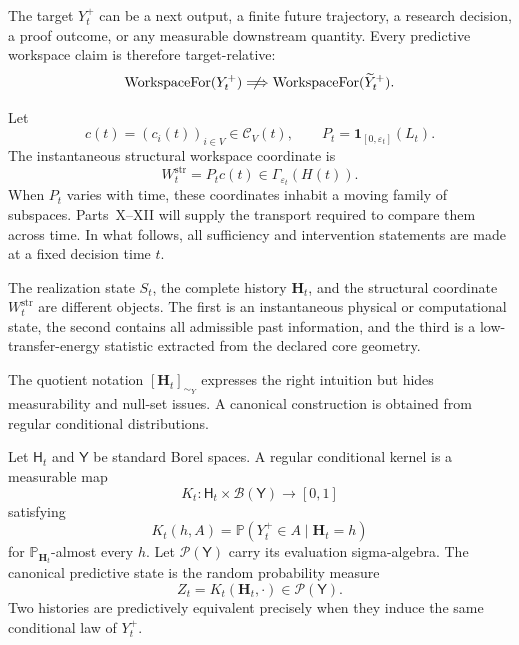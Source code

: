 The target \(Y_t^+\) can be a next output, a finite future trajectory, a
research decision, a proof outcome, or any measurable downstream quantity.
Every predictive workspace claim is therefore target-relative:
\[
\operatorname{WorkspaceFor}(Y_t^+)
\centernot\Longrightarrow
\operatorname{WorkspaceFor}(\widetilde Y_t^+).
\]

Let
\[
c(t)=(c_i(t))_{i\in V}
\in
\mathcal C_V(t),
\qquad
P_t=\mathbf 1_{[0,\varepsilon_t]}(L_t).
\]
The instantaneous structural workspace coordinate is
\[
\boxed{
W_t^{\mathrm{str}}=P_tc(t)
\in
\Gamma_{\varepsilon_t}(H(t)).
}
\]
When \(P_t\) varies with time, these coordinates inhabit a moving family of
subspaces. Parts~X--XII will supply the transport required to compare them
across time. In what follows, all sufficiency and intervention statements
are made at a fixed decision time \(t\).

\begin{remark}
The realization state \(S_t\), the complete history \(\mathbf H_t\), and the
structural coordinate \(W_t^{\mathrm{str}}\) are different objects. The first
is an instantaneous physical or computational state, the second contains all
admissible past information, and the third is a low-transfer-energy statistic
extracted from the declared core geometry.
\end{remark}


The quotient notation
\([\mathbf H_t]_{\sim_Y}\) expresses the right intuition but hides
measurability and null-set issues. A canonical construction is obtained from
regular conditional distributions.

\begin{definition}\label{def:predictive-kernel}
Let \(\mathsf H_t\) and \(\mathsf Y\) be standard Borel spaces. A regular
conditional kernel is a measurable map
\[
K_t:\mathsf H_t\times\mathcal B(\mathsf Y)\to[0,1]
\]
satisfying
\[
K_t(h,A)
=
\mathbb P(Y_t^+\in A\mid\mathbf H_t=h)
\]
for \(\mathbb P_{\mathbf H_t}\)-almost every \(h\). Let
\(\mathcal P(\mathsf Y)\) carry its evaluation sigma-algebra. The canonical
predictive state is the random probability measure
\[
\boxed{
Z_t
=
K_t(\mathbf H_t,\cdot)
\in
\mathcal P(\mathsf Y).
}
\]
Two histories are predictively equivalent precisely when they induce the same
conditional law of \(Y_t^+\).
\end{definition}

